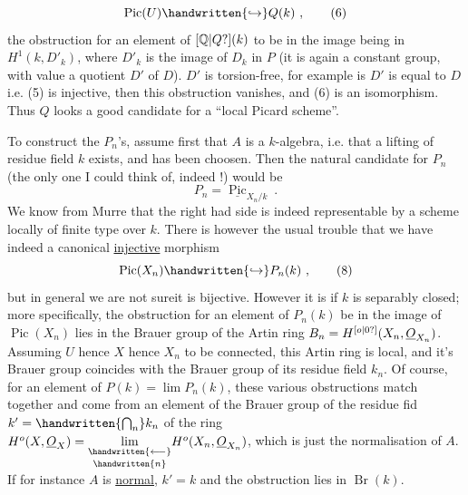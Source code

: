 \[
\operatorname{Pic}(U)\handwritten{\hookrightarrow}Q(k)\ ,
\tag*{(6)}
\]
the obstruction for an element of $[\mathbb{Q}|Q?](k)$ to be in the image being in $H^1(k,D'_k)$, where $D'_k$ is the image of $D_k$ in $P$ (it is again a constant group, with value a quotient $D'$ of $D$).   $D'$ is torsion-free, for example is $D'$ is equal to $D$ i.e. (5) is injective, then this obstruction vanishes, and  (6) is an isomorphism. Thus $Q$ looks a good candidate for a ``local Picard scheme''.

To construct the $P_n$'s, assume first that $A$ is a $k$-algebra, i.e. that a lifting of   residue field $k$ exists, and has been choosen. Then the natural candidate for $P_n$ (the only one I could think of, indeed !) would be
\[
P_n=\underline{\operatorname{Pic}}_{X_n/k}\ .
\tag*{(7)}
\]
We know from Murre that the right had side is indeed representable by a scheme locally of finite type over $k$. There is however the usual trouble that we have indeed a canonical \uline{injective} morphism
\[
\operatorname{Pic}(X_n)\handwritten{\hookrightarrow}P_n(k)\ ,
\tag*{(8)}
\]
but in general we are not sureit is bijective. However it is if $k$ is separably closed; more specifically, the obstruction for an element of $P_n(k)$  be in the image of $\operatorname{Pic}(X_n)$ lies in the Brauer group  
of the Artin ring $B_n=H^{[o|0?]}(X_n,\underline{O}_{X_n})$. Assuming $U$ hence $X$ hence $X_n$ to be connected, this Artin ring is local, and it's Brauer group coincides with the Brauer group of its residue field $k_n$. Of course,  for an element of $P(k)=\lim P_n(k)$, these various obstructions match together and come from an element of the Brauer group of the residue fid $k'=\handwritten{\bigcap_n}k_n$ of the ring $H^o(X,\underline{O}_X)=\underset{\handwritten{n}}{\underset{\handwritten{\longleftarrow}}{\lim}}H^o(X_n,\underline{O}_{X_n})$,  which is just the normalisation of $A$. If for instance $A$ is \uline{normal},  $k'=k$ and the obstruction lies in $\operatorname{Br}(k)$.

